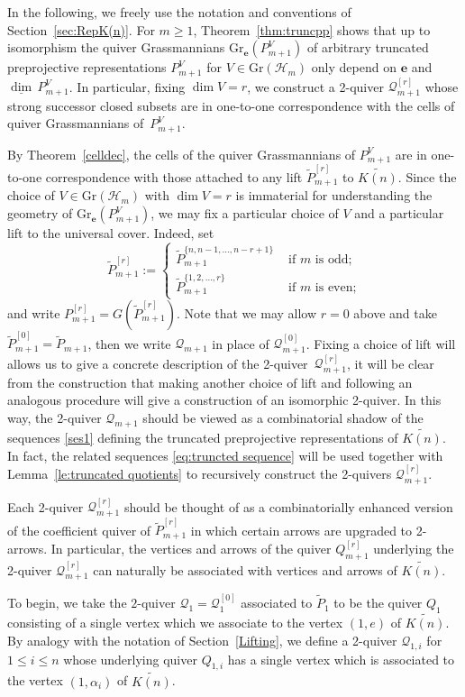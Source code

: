 \documentclass[smallextended,envcountsect,envcountsame]{svjour3}
\numberwithin{equation}{section}
\newcommand{\bfe}{\mathbf{e}}
\newcommand{\cH}{\mathcal{H}}
\newcommand{\cQ}{\mathcal{Q}}
\newcommand\udim{{\underline{\dim}\, }}
\newcommand{\Gr}{\mathrm{Gr}}
\begin{document}
In the following, we freely use the notation and conventions of Section~\ref{sec:RepK(n)}.
For $m\ge1$, Theorem~\ref{thm:truncpp} shows that up to isomorphism the quiver Grassmannians $\Gr_\bfe(P_{m+1}^V)$ of arbitrary truncated preprojective representations $P_{m+1}^V$ for $V\in\Gr(\cH_m)$ only depend on $\bfe$ and $\udim P_{m+1}^V$.
In particular, fixing $\dim V=r$, we construct a 2-quiver $\cQ_{m+1}^{[r]}$ whose strong successor closed subsets are in one-to-one correspondence with the cells of quiver Grassmannians of~$P_{m+1}^V$.

By Theorem~\ref{celldec}, the cells of the quiver Grassmannians of $P_{m+1}^V$ are in one-to-one correspondence with those attached to any lift $\tilde P_{m+1}^{[r]}$ to $\widetilde{K(n)}$.
Since the choice of $V\in\Gr(\cH_m)$ with $\dim V=r$ is immaterial for understanding the geometry of $\Gr_\bfe(P_{m+1}^V)$, we may fix a particular choice of $V$ and a particular lift to the universal cover.
Indeed, set
\[\tilde P_{m+1}^{[r]}:=
  \begin{cases}
    \tilde P_{m+1}^{\{n,n-1,\ldots,n-r+1\}} & \text{ if $m$ is odd;}\\
    \tilde P_{m+1}^{\{1,2,\ldots,r\}} & \text{ if $m$ is even;}
  \end{cases}\] 
and write $P_{m+1}^{[r]}=G(\tilde P_{m+1}^{[r]})$.
Note that we may allow $r=0$ above and take $\tilde P_{m+1}^{[0]}=\tilde P_{m+1}$, then we write $\cQ_{m+1}$ in place of $\cQ_{m+1}^{[0]}$.
Fixing a choice of lift will allows us to give a concrete description of the 2-quiver~$\cQ_{m+1}^{[r]}$, it will be clear from the construction that making another choice of lift and following an analogous procedure will give a construction of an isomorphic 2-quiver.
In this way, the 2-quiver $\cQ_{m+1}$ should be viewed as a combinatorial shadow of the sequences \eqref{ses1} defining the truncated preprojective representations of $\widetilde{K(n)}$.
In fact, the related sequences \eqref{eq:truncted sequence} will be used together with Lemma~\ref{le:truncated quotients} to recursively construct the 2-quivers $\cQ_{m+1}^{[r]}$.

Each 2-quiver $\cQ_{m+1}^{[r]}$ should be thought of as a combinatorially enhanced version of the coefficient quiver of $\tilde P_{m+1}^{[r]}$ in which certain arrows are upgraded to 2-arrows.
In particular, the vertices and arrows of the quiver $Q_{m+1}^{[r]}$ underlying the 2-quiver $\cQ_{m+1}^{[r]}$ can naturally be associated with vertices and arrows of $\widetilde{K(n)}$.

To begin, we take the $2$-quiver $\cQ_1=\cQ_1^{[0]}$ associated to $\tilde P_1$ to be the quiver $Q_1$ consisting of a single vertex which we associate to the vertex $(1,e)$ of $\widetilde{K(n)}$.
By analogy with the notation of Section~\ref{Lifting}, we define a 2-quiver $\cQ_{1,i}$ for $1\le i\le n$ whose underlying quiver $Q_{1,i}$ has a single vertex which is associated to the vertex $(1,\alpha_i)$ of $\widetilde{K(n)}$.
\end{document}

